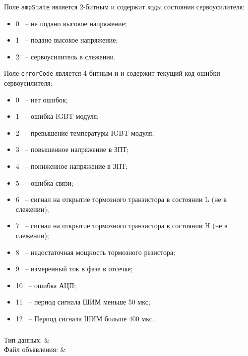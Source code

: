 Поле \texttt{ampState} является 2-битным и содержит коды состояния сервоусилителя:
\begin{itemize}
\item 0 ~-- не подано высокое напряжение; \killoverfullbefore
\item 1 ~-- подано высокое напряжение; \killoverfullbefore
\item 2 ~-- сервоусилитель в слежении. \killoverfullbefore \BL
\end{itemize} 

Поле \texttt{errorCode} является 4-битным и и содержит текущий код ошибки сервоусилителя:
\begin{itemize}
\item 0 ~-- нет ошибок; \killoverfullbefore
\item 1 ~-- ошибка IGBT модуля; \killoverfullbefore
\item 2 ~-- превышение температуры IGBT модуля; \killoverfullbefore 
\item 3 ~-- повышенное напряжение в ЗПТ;
\item 4 ~-- пониженное напряжение в ЗПТ;
\item 5 ~-- ошибка связи;
\item 6 ~-- сигнал на открытие тормозного транзистора в состоянии L (не в слежении);
\item 7 ~-- сигнал на открытие тормозного транзистора в состоянии H (не в слежении);
\item 8 ~-- недостаточная мощность тормозного резистора;
\item 9 ~-- измеренный ток в фазе в отсечке;
\item 10 ~-- ошибка АЦП;
\item 11 ~-- период сигнала ШИМ меньше 50 мкс;
\item 12 ~-- Период сигнала ШИМ больше 400 мкс.\BL
\end{itemize} 
\subsubsection{}
\label{sec:EncoderErrors}

\begin{fHeader}
    Тип данных:            & \\
    Файл объявления:             &  \\
\end{fHeader}

